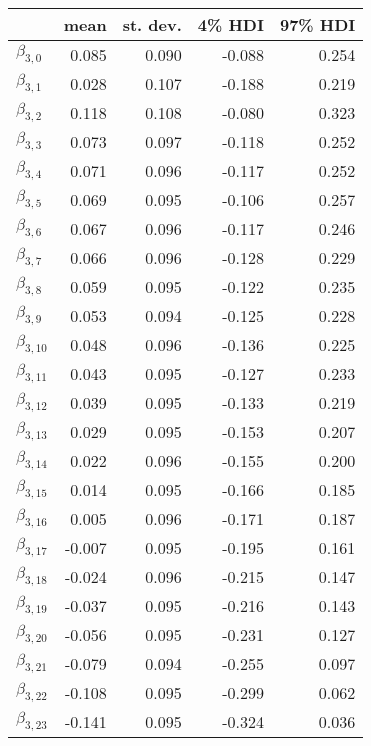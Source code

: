 \begin{tabular}{lrrrr}
\toprule
{} &   mean &  st. dev. &  4\% HDI &  97\% HDI \\
\midrule
$\beta_{3,0}$  &  0.085 &     0.090 &   -0.088 &     0.254 \\
$\beta_{3,1}$  &  0.028 &     0.107 &   -0.188 &     0.219 \\
$\beta_{3,2}$  &  0.118 &     0.108 &   -0.080 &     0.323 \\
$\beta_{3,3}$  &  0.073 &     0.097 &   -0.118 &     0.252 \\
$\beta_{3,4}$  &  0.071 &     0.096 &   -0.117 &     0.252 \\
$\beta_{3,5}$  &  0.069 &     0.095 &   -0.106 &     0.257 \\
$\beta_{3,6}$  &  0.067 &     0.096 &   -0.117 &     0.246 \\
$\beta_{3,7}$  &  0.066 &     0.096 &   -0.128 &     0.229 \\
$\beta_{3,8}$  &  0.059 &     0.095 &   -0.122 &     0.235 \\
$\beta_{3,9}$  &  0.053 &     0.094 &   -0.125 &     0.228 \\
$\beta_{3,10}$ &  0.048 &     0.096 &   -0.136 &     0.225 \\
$\beta_{3,11}$ &  0.043 &     0.095 &   -0.127 &     0.233 \\
$\beta_{3,12}$ &  0.039 &     0.095 &   -0.133 &     0.219 \\
$\beta_{3,13}$ &  0.029 &     0.095 &   -0.153 &     0.207 \\
$\beta_{3,14}$ &  0.022 &     0.096 &   -0.155 &     0.200 \\
$\beta_{3,15}$ &  0.014 &     0.095 &   -0.166 &     0.185 \\
$\beta_{3,16}$ &  0.005 &     0.096 &   -0.171 &     0.187 \\
$\beta_{3,17}$ & -0.007 &     0.095 &   -0.195 &     0.161 \\
$\beta_{3,18}$ & -0.024 &     0.096 &   -0.215 &     0.147 \\
$\beta_{3,19}$ & -0.037 &     0.095 &   -0.216 &     0.143 \\
$\beta_{3,20}$ & -0.056 &     0.095 &   -0.231 &     0.127 \\
$\beta_{3,21}$ & -0.079 &     0.094 &   -0.255 &     0.097 \\
$\beta_{3,22}$ & -0.108 &     0.095 &   -0.299 &     0.062 \\
$\beta_{3,23}$ & -0.141 &     0.095 &   -0.324 &     0.036 \\

\end{tabular}
